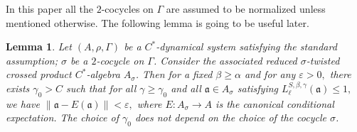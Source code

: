\documentclass[a4paper,11pt,reqno]{amsart}
\theoremstyle{plain}
\newtheorem{lem}[thm]{Lemma}
\theoremstyle{mainthmstyle}
\theoremstyle{named}
\numberwithin{equation}{section}
\begin{document}
In this paper all the $2$-cocycles on $\Gamma$ are assumed to be normalized unless mentioned otherwise. The following lemma is going to be useful later.
\begin{lem}\label{estimate1}
Let $(A,\rho,\Gamma)$ be a $C^{\ast}$-dynamical system satisfying the standard assumption; $\sigma$ be a $2$-cocycle on $\Gamma$. Consider the associated reduced $\sigma$-twisted crossed product $C^{\ast}$-algebra $A_{\sigma}$. Then for a fixed $\beta \geq \alpha$ and for any $\varepsilon > 0,$ there exists $\gamma_0 > C$ such that for all $\gamma \geq \gamma_0$ and all $\mathfrak{a} \in A_{\sigma}$ satisfying $L_{\ell}^{S, \beta, \gamma} (\mathfrak{a}) \leq 1,$ we have $\|\mathfrak{a} - E (\mathfrak{a})\| < \varepsilon,$ where $E : A_{\sigma} \rightarrow A$ is the canonical conditional expectation. The choice of $\gamma_0$ does not depend on the choice of the cocycle $\sigma$.
\end{lem}
\end{document}
